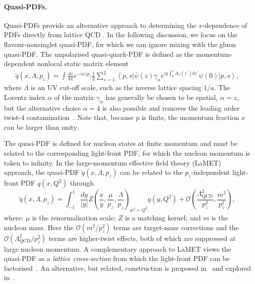 \paragraph{Quasi-PDFs.}
Quasi-PDFs provide an alternative approach to determining the $x$-dependence 
of PDFs directly from lattice QCD \cite{Ji:2013dva,Ji:2014gla}. 
%
In the following discussion, we focus on the flavour-nonsinglet quasi-PDF, 
for which we can ignore mixing with the gluon quasi-PDF. 
%
The unpolarised quasi-quark-PDF is defined as the momentum-dependent
nonlocal static matrix element
\begin{align}\label{eq:qPDF}
\widetilde{q}(x,\Lambda,p_z)  = \int \frac{dz}{4\pi} e^{-i x z p_z} 
\frac{1}{2}\sum_{s=1}^2\left\langle p,s\right\vert \bar{\psi}(z)\gamma_\alpha e^{ig\int_0^z
A_z(z^\prime) dz^\prime} \psi(0) \left\vert p,s\right\rangle ,
\end{align}
where $\Lambda$ is an UV cut-off scale, such as the inverse lattice spacing 
$1/a$. 
%
The Lorentz index $\alpha$ of the matrix $\gamma_\alpha$ has generally be chosen 
to be spatial, $\alpha = z$, but the alternative choice $\alpha = 4$ 
is also possible and removes the leading order twist-4 
contamination~\cite{Radyushkin:2016hsy}. 
%
Note that, because $p$ is finite, the momentum fraction $x$ can be larger 
than unity.

The quasi-PDF is defined for nucleon states at finite momentum and must be 
related to the corresponding light-front PDF, for which the nucleon momentum 
is taken to infinity.
%
In the  large-momentum  effective field theory (LaMET) approach, the quasi-PDF 
$\widetilde{q}(x,\Lambda,p_z)$ can be related to the $p_z$-independent
light-front PDF $q(x,Q^2)$ through~\cite{Ji:2013dva,Ji:2014gla}
\begin{equation} \label{eq:qPDFmatching}
\widetilde{q}(x,\Lambda ,p_z) = 
  \int_{-1}^1 \frac{dy}{\left\vert y\right\vert} 
    Z\left( \frac{x}{y}, \frac{\mu}{p_z}, 
    \frac{\Lambda}{p_z}\right)_{\mu^2 = Q^2} q(y,Q^2) +
  \mathcal{O}\left( \frac{\Lambda_\text{QCD}^2}{p_z^2},\frac{m^2}{p_z^2}\right), 
\end{equation}
where: $\mu$ is the renormalisation scale;
$Z$ is a matching kernel; and $m$ is the nucleon mass.
%
Here the $\mathcal{O}\left(m^2/p_z^2\right)$ terms are target-mass corrections 
and the $ \mathcal{O}\left(\Lambda_\text{QCD}^2/p_z^2\right)$ terms are 
higher-twist effects, both of which are suppressed at large nucleon momentum. 
%
A complementary approach to LaMET views the quasi-PDF as a 
{\it lattice cross-section} from which the light-front PDF can be 
factorised~\cite{Ma:2014jla, Ma:2014jga}.
%
An alternative, but related, construction is proposed 
in~\cite{Radyushkin:2016hsy,Radyushkin:2017cyf} and explored 
in~\cite{Orginos:2017kos}.

